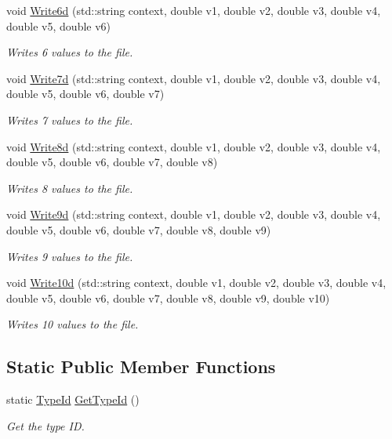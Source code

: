 \begin{DoxyCompactItemize}
void \hyperlink{classns3_1_1FileAggregator_aad86de91e8c56221b406252b7de0a487}{Write6d} (std\+::string context, double v1, double v2, double v3, double v4, double v5, double v6)
\begin{DoxyCompactList}\small\item\em Writes 6 values to the file. \end{DoxyCompactList}\item 
void \hyperlink{classns3_1_1FileAggregator_a11314f97802fde58789bb3b0b2f8da85}{Write7d} (std\+::string context, double v1, double v2, double v3, double v4, double v5, double v6, double v7)
\begin{DoxyCompactList}\small\item\em Writes 7 values to the file. \end{DoxyCompactList}\item 
void \hyperlink{classns3_1_1FileAggregator_ae4f23c08f58ff867eb3bd9f4b2d3d29e}{Write8d} (std\+::string context, double v1, double v2, double v3, double v4, double v5, double v6, double v7, double v8)
\begin{DoxyCompactList}\small\item\em Writes 8 values to the file. \end{DoxyCompactList}\item 
void \hyperlink{classns3_1_1FileAggregator_a4c2babbc71d2e58df1100d87bb0e7608}{Write9d} (std\+::string context, double v1, double v2, double v3, double v4, double v5, double v6, double v7, double v8, double v9)
\begin{DoxyCompactList}\small\item\em Writes 9 values to the file. \end{DoxyCompactList}\item 
void \hyperlink{classns3_1_1FileAggregator_af5f7c950f89b29059dec0691c6232543}{Write10d} (std\+::string context, double v1, double v2, double v3, double v4, double v5, double v6, double v7, double v8, double v9, double v10)
\begin{DoxyCompactList}\small\item\em Writes 10 values to the file. \end{DoxyCompactList}\end{DoxyCompactItemize}
\subsection*{Static Public Member Functions}
\begin{DoxyCompactItemize}
\item 
static \hyperlink{classns3_1_1TypeId}{Type\+Id} \hyperlink{classns3_1_1FileAggregator_af7a4022520c1f0016e960a5a9fa47a42}{Get\+Type\+Id} ()
\begin{DoxyCompactList}\small\item\em Get the type ID. \end{DoxyCompactList}\end{DoxyCompactItemize}
